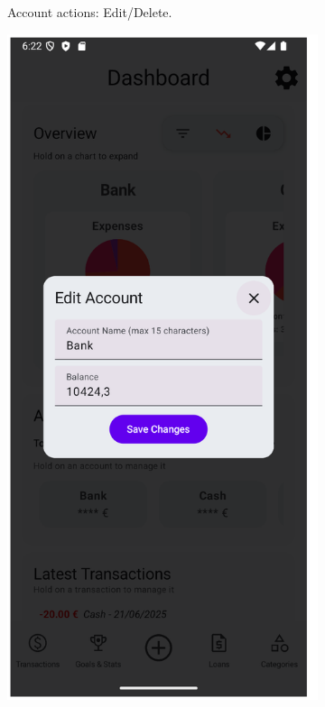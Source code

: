 \documentclass[a4paper,12pt]{article}
\begin{document}
\begin{figure}[H]
\begin{subfigure}[b]{0.23\textwidth}
        \caption{Account actions: Edit/Delete.}
        \label{fig:dashboard_account_actions}
    \end{subfigure}
    \hfill
    \begin{subfigure}[b]{0.23\textwidth}
        \includegraphics[width=\textwidth]{account_edit_dialog.png}

\end{subfigure}
\end{figure}
\end{document}
